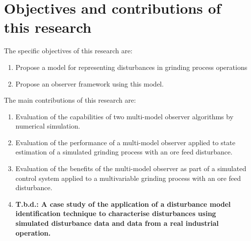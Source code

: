 \section{Objectives and contributions of this research}

The specific objectives of this research are:

\begin{enumerate}
	\item Propose a model for representing disturbances in grinding process operations
	\item Propose an observer framework using this model.
\end{enumerate}


The main contributions of this research are:

\begin{enumerate}
	\item Evaluation of the capabilities of two multi-model observer algorithms by numerical simulation.
	\item Evaluation of the performance of a multi-model observer applied to state estimation of a simulated grinding process with an ore feed disturbance.
	\item Evaluation of the benefits of the multi-model observer as part of a simulated control system applied to a multivariable grinding process with an ore feed disturbance.
	\item \textbf{T.b.d.: A case study of the application of a disturbance model identification technique to characterise disturbances using simulated disturbance data and data from a real industrial operation.}
\end{enumerate}

